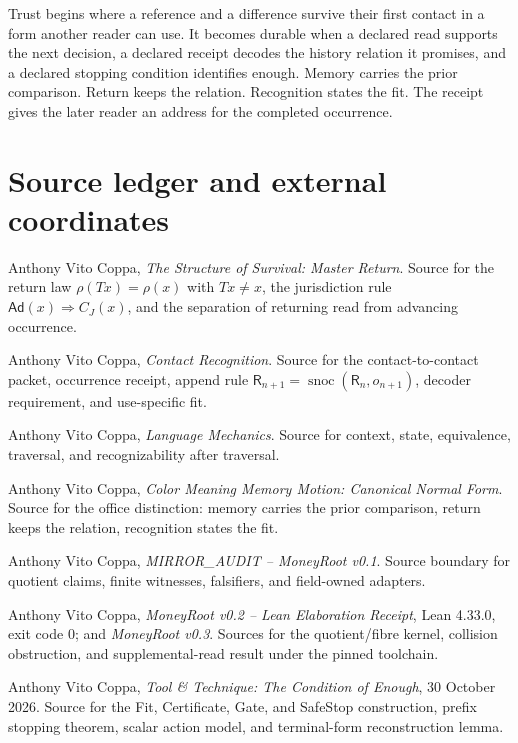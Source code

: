 \documentclass[11pt]{article}
\DeclareMathOperator{\snoc}{snoc}
\begin{document}
Trust begins where a reference and a difference survive their first contact in a form another reader can use. It becomes durable when a declared read supports the next decision, a declared receipt decodes the history relation it promises, and a declared stopping condition identifies enough. Memory carries the prior comparison. Return keeps the relation. Recognition states the fit. The receipt gives the later reader an address for the completed occurrence.

\newpage
\section*{Source ledger and external coordinates}

\small
\begin{enumerate}[label={[\arabic*]},leftmargin=2.1em]
  \item Anthony Vito Coppa, \textit{The Structure of Survival: Master Return}. Source for the return law $\rho(Tx)=\rho(x)$ with $Tx\ne x$, the jurisdiction rule $\mathsf{Ad}(x)\Rightarrow C_J(x)$, and the separation of returning read from advancing occurrence.
  \item Anthony Vito Coppa, \textit{Contact Recognition}. Source for the contact-to-contact packet, occurrence receipt, append rule $\mathsf R_{n+1}=\snoc(\mathsf R_n,o_{n+1})$, decoder requirement, and use-specific fit.
  \item Anthony Vito Coppa, \textit{Language Mechanics}. Source for context, state, equivalence, traversal, and recognizability after traversal.
  \item Anthony Vito Coppa, \textit{Color Meaning Memory Motion: Canonical Normal Form}. Source for the office distinction: memory carries the prior comparison, return keeps the relation, recognition states the fit.
  \item Anthony Vito Coppa, \textit{MIRROR\_AUDIT -- MoneyRoot v0.1}. Source boundary for quotient claims, finite witnesses, falsifiers, and field-owned adapters.
  \item Anthony Vito Coppa, \textit{MoneyRoot v0.2 -- Lean Elaboration Receipt}, Lean 4.33.0, exit code 0; and \textit{MoneyRoot v0.3}. Sources for the quotient/fibre kernel, collision obstruction, and supplemental-read result under the pinned toolchain.
  \item Anthony Vito Coppa, \textit{Tool \& Technique: The Condition of Enough}, 30 October 2026. Source for the Fit, Certificate, Gate, and SafeStop construction, prefix stopping theorem, scalar action model, and terminal-form reconstruction lemma.

\end{enumerate}
\end{document}

